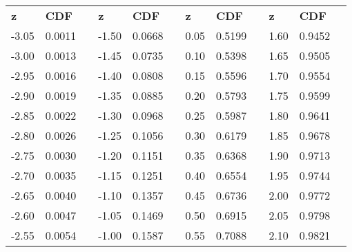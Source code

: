 \documentclass[letterpaper]{article}
\begin{document}

\small

\begin{table}[ht!]
\renewcommand{\arraystretch}{1.2}
\centering
\begin{tabular}{|p{}|p{}|p{}|p{}|p{}|p{}|p{}|p{}|p{}|p{}|p{}|p{}}
\cline{1-2} \cline{4-5} \cline{7-8}  \cline{10-11}
\textbf{z} & \textbf{CDF} &  & \textbf{z} & \textbf{CDF} &  & \textbf{z} & \textbf{CDF} &  & \textbf{z} & \textbf{CDF} &  \\ \cline{1-2} \cline{4-5} \cline{7-8}  \cline{10-11}
-3.05 & 0.0011 &  & -1.50 & 0.0668 &  & 0.05 & 0.5199 &  & 1.60 & 0.9452 &  \\ \cline{1-2} \cline{4-5} \cline{7-8}  \cline{10-11}
-3.00 & 0.0013 &  & -1.45 & 0.0735 &  & 0.10 & 0.5398 &  & 1.65 & 0.9505 &  \\ \cline{1-2} \cline{4-5} \cline{7-8}  \cline{10-11}
-2.95 & 0.0016 &  & -1.40 & 0.0808 &  & 0.15 & 0.5596 &  & 1.70 & 0.9554 &  \\ \cline{1-2} \cline{4-5} \cline{7-8}  \cline{10-11}
-2.90 & 0.0019 &  & -1.35 & 0.0885 &  & 0.20 & 0.5793 &  & 1.75 & 0.9599 &  \\ \cline{1-2} \cline{4-5} \cline{7-8}  \cline{10-11}
-2.85 & 0.0022 &  & -1.30 & 0.0968 &  & 0.25 & 0.5987 &  & 1.80 & 0.9641 &  \\ \cline{1-2} \cline{4-5} \cline{7-8}  \cline{10-11}
-2.80 & 0.0026 &  & -1.25 & 0.1056 &  & 0.30 & 0.6179 &  & 1.85 & 0.9678 &  \\ \cline{1-2} \cline{4-5} \cline{7-8}  \cline{10-11}
-2.75 & 0.0030 &  & -1.20 & 0.1151 &  & 0.35 & 0.6368 &  & 1.90 & 0.9713 &  \\ \cline{1-2} \cline{4-5} \cline{7-8}  \cline{10-11}
-2.70 & 0.0035 &  & -1.15 & 0.1251 &  & 0.40 & 0.6554 &  & 1.95 & 0.9744 &  \\ \cline{1-2} \cline{4-5} \cline{7-8}  \cline{10-11}
-2.65 & 0.0040 &  & -1.10 & 0.1357 &  & 0.45 & 0.6736 &  & 2.00 & 0.9772 &  \\ \cline{1-2} \cline{4-5} \cline{7-8}  \cline{10-11}
-2.60 & 0.0047 &  & -1.05 & 0.1469 &  & 0.50 & 0.6915 &  & 2.05 & 0.9798 &  \\ \cline{1-2} \cline{4-5} \cline{7-8}  \cline{10-11}
-2.55 & 0.0054 &  & -1.00 & 0.1587 &  & 0.55 & 0.7088 &  & 2.10 & 0.9821 &  \\ \cline{1-2} \cline{4-5} \cline{7-8}  \cline{10-11}

\end{tabular}
\end{table}
\end{document}

